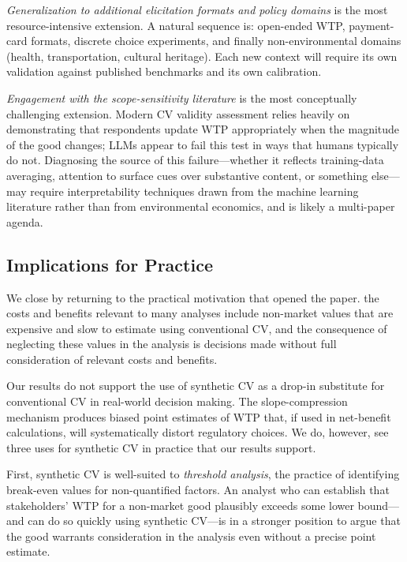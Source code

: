 \documentclass[12pt]{article}
\begin{document}
\textit{Generalization to additional elicitation formats and policy domains} is the most resource-intensive extension. A natural sequence is: open-ended WTP, payment-card formats, discrete choice experiments, and finally non-environmental domains (health, transportation, cultural heritage). Each new context will require its own validation against published benchmarks and its own calibration.

\textit{Engagement with the scope-sensitivity literature} is the most conceptually challenging extension. Modern CV validity assessment relies heavily on demonstrating that respondents update WTP appropriately when the magnitude of the good changes; LLMs appear to fail this test in ways that humans typically do not. Diagnosing the source of this failure---whether it reflects training-data averaging, attention to surface cues over substantive content, or something else---may require interpretability techniques drawn from the machine learning literature rather than from environmental economics, and is likely a multi-paper agenda.

\subsection{Implications for Practice}\label{sec:disc-policy}

We close by returning to the practical motivation that opened the paper. the costs and benefits relevant to many analyses include non-market values that are expensive and slow to estimate using conventional CV, and the consequence of neglecting these values in the analysis is decisions made without full consideration of relevant costs and benefits.

Our results do not support the use of synthetic CV as a drop-in substitute for conventional CV in real-world decision making. The slope-compression mechanism produces biased point estimates of WTP that, if used in net-benefit calculations, will systematically distort regulatory choices. We do, however, see three uses for synthetic CV in practice that our results support.

First, synthetic CV is well-suited to \emph{threshold analysis}, the practice of identifying break-even values for non-quantified factors. An analyst who can establish that stakeholders' WTP for a non-market good plausibly exceeds some lower bound---and can do so quickly using synthetic CV---is in a stronger position to argue that the good warrants consideration in the analysis even without a precise point estimate.
\end{document}
